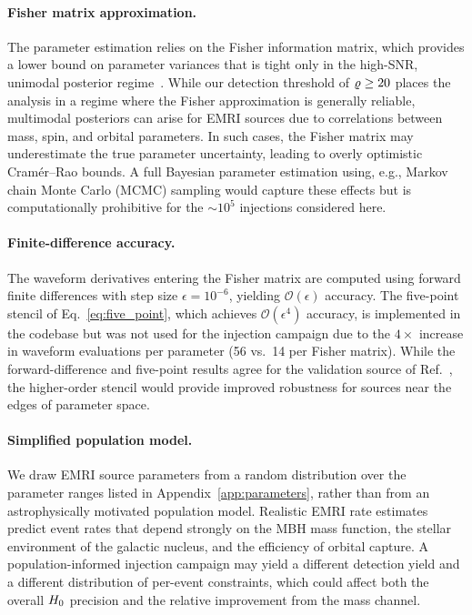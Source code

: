 \paragraph{Fisher matrix approximation.}
The parameter estimation relies on the Fisher information matrix, which
provides a lower bound on parameter variances that is tight only in the
high-SNR, unimodal posterior regime~\cite{Vallisneri:2007ev}.  While our
detection threshold of $\varrho \geq 20$ places the analysis in a regime
where the Fisher approximation is generally reliable, multimodal
posteriors can arise for EMRI sources due to correlations between mass,
spin, and orbital parameters.  In such cases, the Fisher matrix may
underestimate the true parameter uncertainty, leading to overly
optimistic Cram\'{e}r--Rao bounds.  A full Bayesian parameter estimation
using, e.g., Markov chain Monte Carlo (MCMC) sampling would capture
these effects but is computationally prohibitive for the $\sim 10^5$
injections considered here.

\paragraph{Finite-difference accuracy.}
The waveform derivatives entering the Fisher matrix are computed using
forward finite differences with step size $\epsilon = 10^{-6}$,
yielding $\mathcal{O}(\epsilon)$ accuracy.  The five-point stencil of
Eq.~\eqref{eq:five_point}, which achieves $\mathcal{O}(\epsilon^4)$
accuracy, is implemented in the codebase but was not used for the
injection campaign due to the $4\times$ increase in waveform evaluations
per parameter (56 vs.\ 14 per Fisher matrix).  While the forward-difference
and five-point results agree for the validation source of
Ref.~\cite{Babak:2017tow}, the higher-order stencil would provide
improved robustness for sources near the edges of parameter space.

\paragraph{Simplified population model.}
We draw EMRI source parameters from a random distribution over the
parameter ranges listed in Appendix~\ref{app:parameters}, rather than
from an astrophysically motivated population model.  Realistic EMRI rate
estimates~\cite{Babak:2017tow} predict event rates that depend strongly
on the MBH mass function, the stellar environment of the galactic
nucleus, and the efficiency of orbital capture.  A population-informed
injection campaign may yield a different detection yield and a different
distribution of per-event constraints, which could affect both the
overall $H_0$ precision and the relative improvement from the mass
channel.

